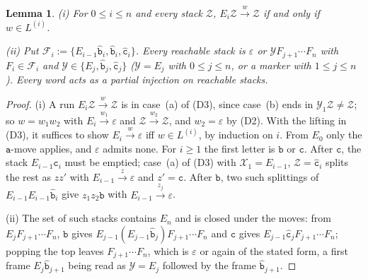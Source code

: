 \documentclass[11pt]{article}
\numberwithin{equation}{section}
\theoremstyle{plain}
\newtheorem{lemma}[theorem]{Lemma}
\theoremstyle{definition}
\theoremstyle{remark}
\newcommand{\eps}{\varepsilon}
\theoremstyle{plain}
\begin{document}
\begin{lemma}\label{lem:app-br-recognition}
\label{lem:app-tl-reachable}
\textup{(i)} For $0\le i\le n$ and every stack $\mathcal Z$,
$E_i\mathcal Z\xrightarrow{w}\mathcal Z$ if and only if $w\in L^{(i)}$.

\textup{(ii)} Put $\mathcal F_i:=\{E_{i-1}\hat{\mathtt b}_i,\hat{\mathtt b}_i,\hat{\mathtt c}_i\}$.
Every reachable stack is $\eps$ or $\mathcal YF_{j+1}\cdots F_n$ with
$F_i\in\mathcal F_i$ and $\mathcal Y\in\{E_j,\hat{\mathtt b}_j,\hat{\mathtt c}_j\}$
\textup($\mathcal Y=E_j$ with $0\le j\le n$, or a marker with $1\le j\le n$\textup).
Every word acts as a partial injection on reachable stacks.
\end{lemma}

\begin{proof}
(i) A run $E_i\mathcal Z\xrightarrow{w}\mathcal Z$ is in case~(a) of (D3), since
case~(b) ends in $\mathcal Y_1\mathcal Z\ne\mathcal Z$; so $w=w_1w_2$ with
$E_i\xrightarrow{w_1}\eps$ and $\mathcal Z\xrightarrow{w_2}\mathcal Z$, and $w_2=\eps$ by
(D2).  With the lifting in (D3), it suffices to show $E_i\xrightarrow{w}\eps$ iff
$w\in L^{(i)}$, by induction on $i$.  From $E_0$ only the $\mathtt a$-move applies,
and $\eps$ admits none.  For $i\ge1$ the first letter is $\mathtt b$ or $\mathtt c$.
After $\mathtt c$, the stack $E_{i-1}\hat{\mathtt c}_i$ must be emptied; case~(a) of
(D3) with $\mathcal X_1=E_{i-1}$, $\mathcal Z=\hat{\mathtt c}_i$ splits the rest as $zz'$
with $E_{i-1}\xrightarrow{z}\eps$ and $z'=\mathtt c$.  After $\mathtt b$, two such
splittings of $E_{i-1}E_{i-1}\hat{\mathtt b}_i$ give $z_1z_2\mathtt b$ with
$E_{i-1}\xrightarrow{z_j}\eps$.

(ii) The set of such stacks contains $E_n$ and is closed under the moves: from
$E_jF_{j+1}\cdots F_n$, $\mathtt b$ gives
$E_{j-1}(E_{j-1}\hat{\mathtt b}_j)F_{j+1}\cdots F_n$ and $\mathtt c$ gives
$E_{j-1}\hat{\mathtt c}_jF_{j+1}\cdots F_n$; popping the top leaves
$F_{j+1}\cdots F_n$, which is $\eps$ or again of the stated form, a first frame
$E_j\hat{\mathtt b}_{j+1}$ being read as $\mathcal Y=E_j$ followed by the frame
$\hat{\mathtt b}_{j+1}$.


\end{proof}
\end{document}
